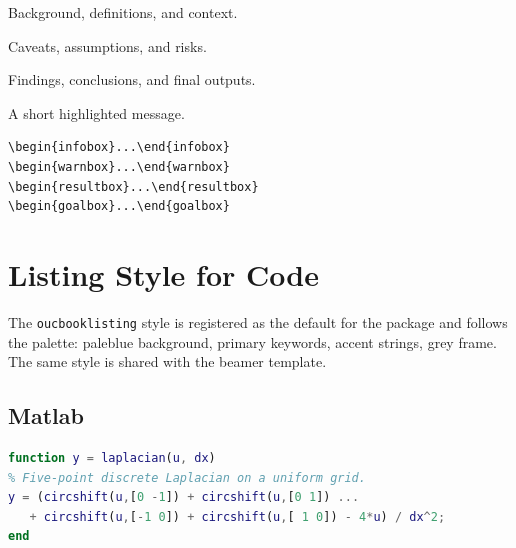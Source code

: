 \begin{fullwidth}
\begin{minipage}[t]{0.48\linewidth}
\begin{infobox}
Background, definitions, and context.
\end{infobox}
\begin{warnbox}
Caveats, assumptions, and risks.
\end{warnbox}
\begin{resultbox}
Findings, conclusions, and final outputs.
\end{resultbox}
\begin{goalbox}
\centering A short highlighted message.
\end{goalbox}
\end{minipage}\hfill
\begin{minipage}[t]{0.48\linewidth}
\begin{lstlisting}[language={[LaTeX]TeX}]
\begin{infobox}...\end{infobox}
\begin{warnbox}...\end{warnbox}
\begin{resultbox}...\end{resultbox}
\begin{goalbox}...\end{goalbox}
\end{lstlisting}
\end{minipage}
\end{fullwidth}

\section{Listing Style for Code}

The \texttt{oucbooklisting} style is registered as the default for the
 package and follows the palette: paleblue background,
primary keywords, accent strings, grey frame.  The same style is shared with
the beamer template.

\subsection{Matlab}
\begin{lstlisting}[language=Matlab]
function y = laplacian(u, dx)
% Five-point discrete Laplacian on a uniform grid.
y = (circshift(u,[0 -1]) + circshift(u,[0 1]) ...
   + circshift(u,[-1 0]) + circshift(u,[ 1 0]) - 4*u) / dx^2;
end
\end{lstlisting}

